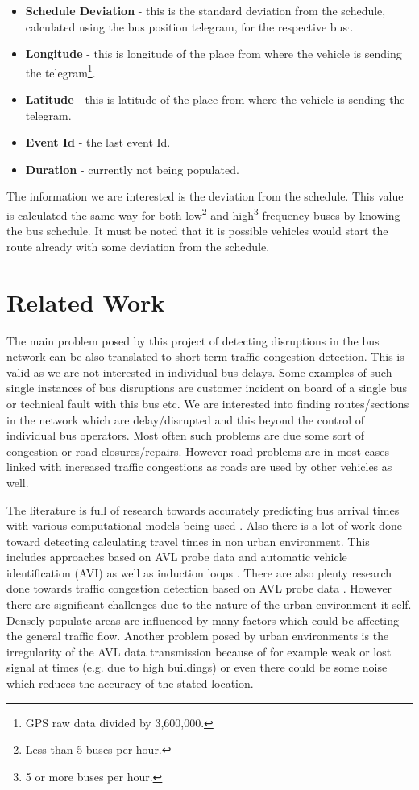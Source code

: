 \begin{itemize}
	\item \textbf{Schedule Deviation} - this is the standard deviation from the schedule, calculated using the bus position telegram, for the respective bus\footnotemark[\ref{loggedProperly}]$^{,}$\footnotemark[\ref{routeVariant}].
	\item \textbf{Longitude} - this is longitude of the place from where the vehicle is sending the telegram\footnote{\label{gps}GPS raw data divided by 3,600,000.}.
	\item \textbf{Latitude} - this is latitude of the place from where the vehicle is sending the telegram\footnotemark[\ref{gps}].
	\item \textbf{Event Id} - the last event Id.
	\item \textbf{Duration} - currently not being populated.
\end{itemize}

The information we are interested is the deviation from the schedule. This value is calculated the same way for both low\footnote{Less than 5 buses per hour.} and high\footnote{5 or more buses per hour.} frequency buses by knowing the bus schedule. It must be noted that it is possible vehicles would start the route already with some deviation from the schedule.

\section{Related Work}
The main problem posed by this project of detecting disruptions in the bus network can be also translated to short term traffic congestion detection. This is valid as we are not interested in individual bus delays. Some examples of such single instances of bus disruptions are customer incident on board of a single bus or technical fault with this bus etc. We are interested into finding routes/sections in the network which are delay/disrupted and this beyond the control of individual bus operators. Most often such problems are due some sort of congestion or road closures/repairs. However road problems are in most cases linked with increased traffic congestions as roads are used by other vehicles as well.

The literature is full of research towards accurately predicting bus arrival times with various computational models being used \cite{altinkaya2013urban}. Also there is a lot of work done toward detecting calculating travel times in non urban environment. This includes approaches based on AVL probe data and automatic vehicle identification (AVI) as well as induction loops \cite{Vlahogianni20143}. There are also plenty research done towards traffic congestion detection based on AVL probe data \cite{Vlahogianni20143}. However there are significant challenges due to the nature of the urban environment it self. Densely populate areas are influenced by many factors which could be affecting the general traffic flow. Another problem posed by urban environments is the irregularity of the AVL data transmission because of for example weak or lost signal at times (e.g. due to high buildings) or even there could be some noise which reduces the accuracy of the stated location. 

